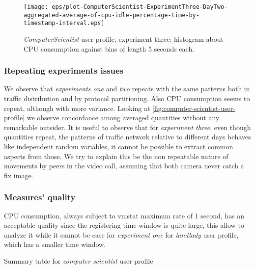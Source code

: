 \documentclass[10pt,a4paper]{article}
\begin{document}
    \begin{figure}
      \centering
      \texttt{[image: eps/plot-ComputerScientist-ExperimentThree-DayTwo-aggregated-average-of-cpu-idle-percentage-time-by-timestamp-interval.eps]}
      \caption{\emph{ComputerScientist} user profile, experiment
        three: histogram about CPU consumption against bins of length 5
        seconds each.}
      \label{fig:computer-scientist-user-profile-experiment-three-aggregate-cpu-idle-percentage}
    \end{figure}

    \subsubsection*{Repeating experiments issues}
    
    We observe that \emph{experiments one} and \emph{two} repeats with
    the same patterns both in traffic distribution and by protocol
    partitioning. Also CPU consumption seems to repeat, although with
    more variance. Looking at
    \autoref{fig:computer-scientist-user-profile} we observe
    concordance among averaged quantities without any remarkable
    outsider. It is useful to observe that for \emph{experiment
      three}, even though quantities repeat, the patterns of traffic
    network relative to different days behaves like independent random
    variables, it cannot be possible to extract common aspects from
    those. We try to explain this be the non repeatable nature of
    movements by peers in the video call, assuming that both camera
    never catch a fix image.


    \subsubsection*{Measures' quality}
    CPU consumption, always subject to vmstat maximum rate of 1
    second, has an acceptable quality since the registering time
    window is quite large, this allow to analyze it while it cannot be
    case for \emph{experiment one} for \emph{landlady} user profile,
    which has a smaller time window.

    \begin{table}
      \begin{adjustwidth}{-2cm}{}
            
      \end{adjustwidth}
      \caption{Summary table for \emph{computer scientist} user profile}
      \label{fig:computer-scientist-user-profile}
    \end{table}
\end{document}
